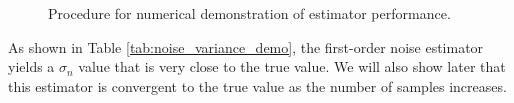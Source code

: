 \begin{figure}[!h]
    \centering
    \caption{Procedure for numerical demonstration of estimator performance.}
    \label{fig:noise_variance_demo_procedure}
\end{figure}

As shown in Table \ref{tab:noise_variance_demo}, the first-order noise estimator yields a $\sigma_n$ value that is very close to the true value. We will also show later that this estimator is convergent to the true value as the number of samples increases.

